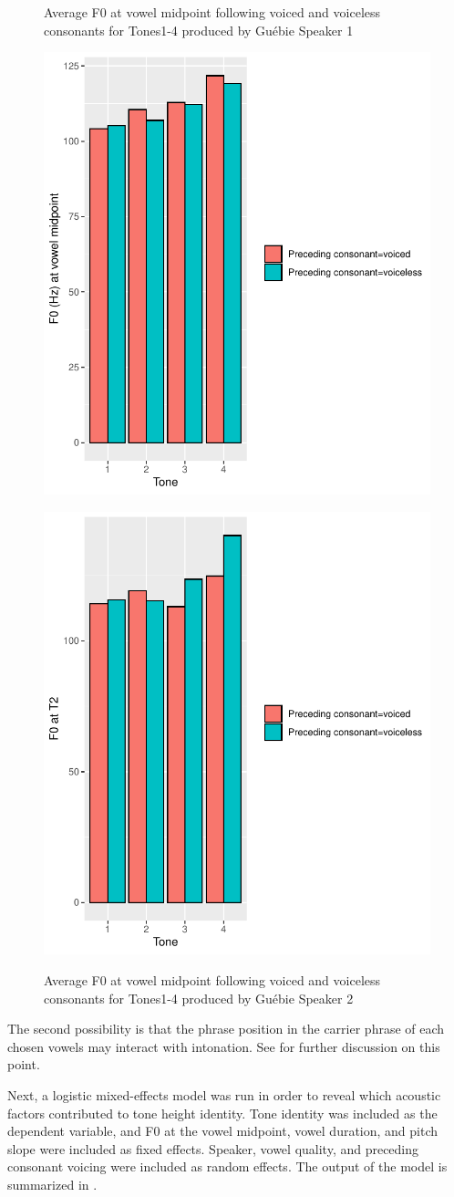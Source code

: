 \documentclass[output=paper]{langscibook}
\begin{document}
\begin{figure}
\begin{floatrow}
 \captionsetup{margin=.05\linewidth}
 \ffigbox
 {\caption{Average F0 at vowel midpoint following voiced and voiceless consonants for Tones1-4 produced by Guébie Speaker 1\label{fig:oakley:olivierPitchVoicing}}}
 {\includegraphics[width=.5\textwidth]{figures/OlivierPitchVoicing.pdf}}%
 \ffigbox
 {\caption{Average F0 at vowel midpoint following voiced and voiceless consonants for Tones1-4 produced by Guébie Speaker 2\label{fig:oakley:borisPitchVoicing}}}
 {\includegraphics[width=.5\textwidth]{figures/BorisVoicingPitch.pdf}}
\end{floatrow}
\end{figure}

The second possibility is that the phrase position in the carrier phrase of each chosen vowels may interact with intonation. See  for further discussion on this point.

Next, a logistic mixed-effects model was run in order to reveal which acoustic factors contributed to tone height identity. Tone identity was included as the dependent variable, and F0 at the vowel midpoint, vowel duration, and pitch slope were included as fixed effects. Speaker, vowel quality, and preceding consonant voicing were included as random effects. The output of the model is summarized in .
\end{document}
